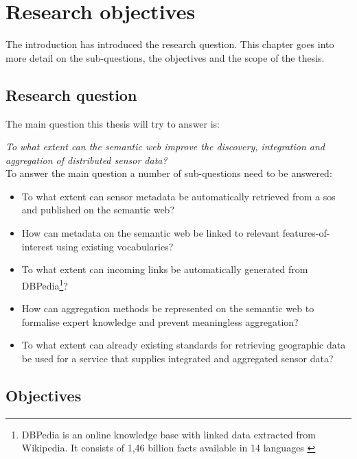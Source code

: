 
\section{Research objectives}
\label{chap:objectives}

The introduction has introduced the research question. This chapter goes into more detail on the sub-questions, the  objectives and the scope of the thesis.   

\subsection{Research question} 
The main question this thesis will try to answer is: 

\textit{To what extent can the semantic web improve the discovery, integration and aggregation of distributed sensor data?}\\

To answer the main question a number of sub-questions need to be answered:
\begin{itemize}
	\item To what extent can sensor metadata be automatically retrieved from a \ac{sos} and published on the semantic web?
	\item How can metadata on the semantic web be linked to relevant features-of-interest using existing vocabularies?
	\item To what extent can incoming links be automatically generated from DBPedia\footnote{DBPedia is an online knowledge base with linked data extracted from Wikipedia. It consists of 1,46 billion facts available in 14 languages \citep{LD:DBPedia}}?
	\item How can aggregation methods be represented on the semantic web to formalise expert knowledge and prevent meaningless aggregation?
	\item To what extent can already existing standards for retrieving geographic data be used for a service that supplies integrated and aggregated sensor data?
\end{itemize}

\subsection{Objectives}

